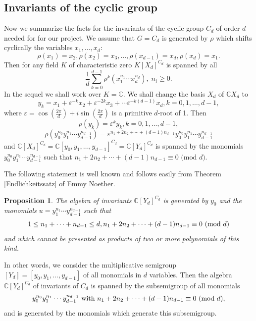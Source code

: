 \documentclass{amsart}
\newtheorem{proposition}[theorem]{Proposition}
\theoremstyle{definition}
\begin{document}
\subsection{Invariants of the cyclic group}
Now we summarize the facts for the invariants of the cyclic group $C_d$ of order $d$ needed for for our project.
We assume that $G=C_d$ is generated by $\rho$ which shifts cyclically the variables $x_1,\ldots,x_d$:
\[
\rho(x_1)=x_2,\rho(x_2)=x_3,\ldots,\rho(x_{d-1})=x_d,\rho(x_d)=x_1.
\]
Then for any field $K$ of characteristic zero $K[X_d]^{C_d}$ is spanned by all
\[
\frac{1}{d}\sum_{k=0}^{d-1}\rho^k(x_1^{n_1}\cdots x_d^{n_d}),\; n_i\geq 0.
\]
In the sequel we shall work over $K=\mathbb C$.
We shall change the basis $X_d$ of ${\mathbb C}X_d$ to
\[
y_k=x_1+\varepsilon^{-k}x_2+\varepsilon^{-2k}x_3+\cdots \varepsilon^{-k(d-1)}x_d,k=0,1,\ldots,d-1,
\]
where $\displaystyle \varepsilon=\cos\left(\frac{2\pi}{d}\right)+i\sin\left(\frac{2\pi}{d}\right)$ is a primitive $d$-root of 1.
Then
\[
\rho(y_k)=\varepsilon^ky_k, k=0,1,\ldots,d-1,
\]
\[
\rho(y_0^{n_0}y_1^{n_1}\cdots y_{d-1}^{n_{d-1}})=\varepsilon^{n_1+2n_2+\cdots+(d-1)n_{d-1}}y_0^{n_0}y_1^{n_1}\cdots y_{d-1}^{n_{d-1}}
\]
and ${\mathbb C}[X_d]^{C_d}={\mathbb C}[y_0,y_1,\ldots,y_{d-1}]^{C_d}={\mathbb C}[Y_d]^{C_d}$ is spanned by the monomials $y_0^{n_0}y_1^{n_1}\cdots y_{d-1}^{n_{d-1}}$ such that
$n_1+2n_2+\cdots+(d-1)n_{d-1}\equiv 0\text{ (mod }d)$.

The following statement is well known and follows easily from Theorem \ref{Endlichkeitssatz} of Emmy Noether.

\begin{proposition}\label{commutative case}
The algebra of invariants ${\mathbb C}[Y_d]^{C_d}$ is generated by $y_0$ and the monomials
$u=y_1^{n_1}\cdots y_{d-1}^{n_{d-1}}$ such that
\[
1\leq n_1+\cdots+n_{d-1}\leq d,n_1+2n_2+\cdots+(d-1)n_{d-1}\equiv 0 \text{ \rm (mod }d)
\]
and which cannot be presented as products of two or more polynomials of this kind.
\end{proposition}

In other words, we consider the multiplicative semigroup $[Y_d]=[y_0,y_1,\ldots,y_{d-1}]$ of all monomials in $d$ variables. Then the algebra ${\mathbb C}[Y_d]^{C_d}$ of invariants of $C_d$
is spanned by the subsemigroup of all monomials
\[
y_0^{n_0}y_1^{n_1}\cdots y_{d-1}^{n_{d-1}}\text{ with }n_1+2n_2+\cdots+(d-1)n_{d-1}\equiv 0 \text{ \rm (mod }d),
\]
and is generated by the monomials which generate this subsemigroup.
\end{document}
